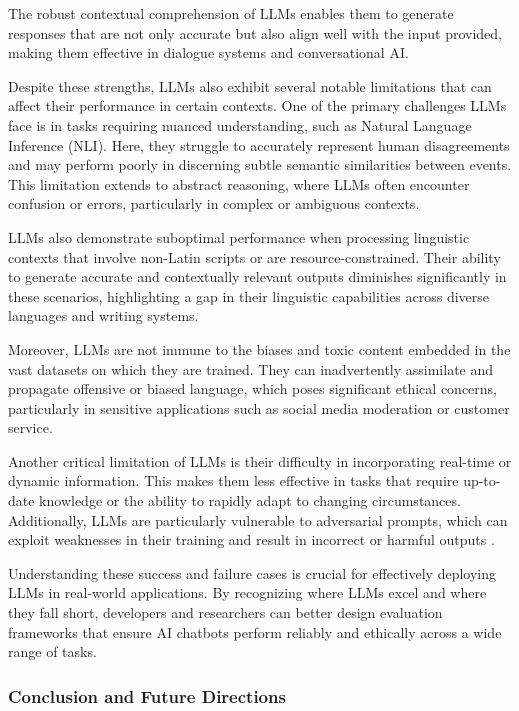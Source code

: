 The robust contextual comprehension of LLMs enables them to generate responses that are not only accurate but also align well with the input provided, making them effective in dialogue systems and conversational AI.

Despite these strengths, LLMs also exhibit several notable limitations that can affect their performance in certain contexts. One of the primary challenges LLMs face is in tasks requiring nuanced understanding, such as Natural Language Inference (NLI). Here, they struggle to accurately represent human disagreements and may perform poorly in discerning subtle semantic similarities between events. This limitation extends to abstract reasoning, where LLMs often encounter confusion or errors, particularly in complex or ambiguous contexts.

LLMs also demonstrate suboptimal performance when processing linguistic contexts that involve non-Latin scripts or are resource-constrained. Their ability to generate accurate and contextually relevant outputs diminishes significantly in these scenarios, highlighting a gap in their linguistic capabilities across diverse languages and writing systems.

Moreover, LLMs are not immune to the biases and toxic content embedded in the vast datasets on which they are trained. They can inadvertently assimilate and propagate offensive or biased language, which poses significant ethical concerns, particularly in sensitive applications such as social media moderation or customer service.

Another critical limitation of LLMs is their difficulty in incorporating real-time or dynamic information. This makes them less effective in tasks that require up-to-date knowledge or the ability to rapidly adapt to changing circumstances. Additionally, LLMs are particularly vulnerable to adversarial prompts, which can exploit weaknesses in their training and result in incorrect or harmful outputs \cite{chang2024survey}.

Understanding these success and failure cases is crucial for effectively deploying LLMs in real-world applications. By recognizing where LLMs excel and where they fall short, developers and researchers can better design evaluation frameworks that ensure AI chatbots perform reliably and ethically across a wide range of tasks.

\subsubsection{Conclusion and Future Directions}

